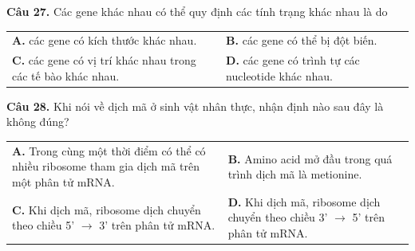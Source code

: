 \documentclass{article}
\begin{document}
\begin{minipage}[t][14.4cm][t]{\linewidth}
\fontsize{20}{26}\selectfont

\textbf{Câu 27.} Các gene khác nhau có thể quy định các tính trạng khác nhau là do\\[4pt]
\begin{tabularx}{\linewidth}{@{}X X@{}}
\textbf{A. } các gene có kích thước khác nhau. & \textbf{B. } các gene có thể bị đột biến.\\[4pt]
\textbf{C. } các gene có vị trí khác nhau trong các tế bào khác nhau. & \textbf{D. } các gene có trình tự các nucleotide khác nhau.
\end{tabularx}
\vspace*{\fill}
\textbf{Câu 28.} Khi nói về dịch mã ở sinh vật nhân thực, nhận định nào sau đây là không đúng?\\[4pt]
\begin{tabularx}{\linewidth}{@{}X X@{}}
\textbf{A. } Trong cùng một thời điểm có thể có nhiều ribosome tham gia dịch mã trên một phân tử mRNA. & \textbf{B. } Amino acid mở đầu trong quá trình dịch mã là metionine.\\[4pt]
\textbf{C. } Khi dịch mã, ribosome dịch chuyển theo chiều 5' $\rightarrow$ 3' trên phân tử mRNA. & \textbf{D. } Khi dịch mã, ribosome dịch chuyển theo chiều 3' $\rightarrow$ 5' trên phân tử mRNA.
\end{tabularx}

\end{minipage}
\newpage
\end{document}
